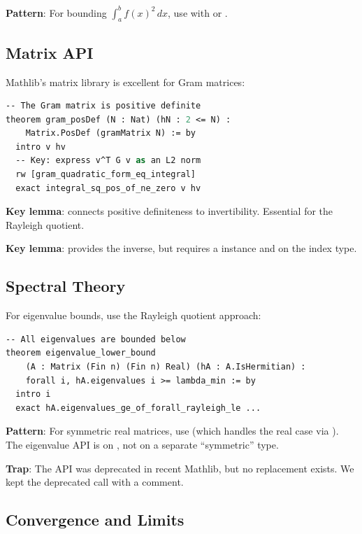 \documentclass[11pt,a4paper]{article}
\begin{document}
\textbf{Pattern}: For bounding $\int_a^b f(x)^2\,dx$, use
 with
 or .

\subsection{Matrix API}

Mathlib's matrix library is excellent for Gram matrices:

\begin{lstlisting}[language=ML,caption={Positive definiteness}]
-- The Gram matrix is positive definite
theorem gram_posDef (N : Nat) (hN : 2 <= N) :
    Matrix.PosDef (gramMatrix N) := by
  intro v hv
  -- Key: express v^T G v as an L2 norm
  rw [gram_quadratic_form_eq_integral]
  exact integral_sq_pos_of_ne_zero v hv
\end{lstlisting}

\textbf{Key lemma}:  connects positive
definiteness to invertibility. Essential for the Rayleigh quotient.

\textbf{Key lemma}:  provides the inverse,
but requires a  instance and  on
the index type.

\subsection{Spectral Theory}

For eigenvalue bounds, use the Rayleigh quotient approach:

\begin{lstlisting}[language=ML,caption={Rayleigh quotient bound}]
-- All eigenvalues are bounded below
theorem eigenvalue_lower_bound
    (A : Matrix (Fin n) (Fin n) Real) (hA : A.IsHermitian) :
    forall i, hA.eigenvalues i >= lambda_min := by
  intro i
  exact hA.eigenvalues_ge_of_forall_rayleigh_le ...
\end{lstlisting}

\textbf{Pattern}: For symmetric real matrices, use
 (which handles the real case via
). The eigenvalue API is on ,
not on a separate ``symmetric'' type.

\textbf{Trap}: The API 
was deprecated in recent Mathlib, but no replacement exists. We kept
the deprecated call with a comment.

\subsection{Convergence and Limits}
\end{document}
